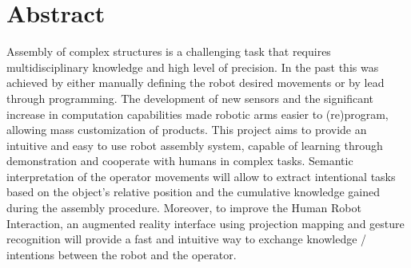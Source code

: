 \chapter*{Abstract}

Assembly of complex structures is a challenging task that requires multidisciplinary knowledge and high level of precision. In the past this was achieved by either manually defining the robot desired movements or by lead through programming. The development of new sensors and the significant increase in computation capabilities made robotic arms easier to (re)program, allowing mass customization of products. This project aims to provide an intuitive and easy to use robot assembly system, capable of learning through demonstration and cooperate with humans in complex tasks. Semantic interpretation of the operator movements will allow to extract intentional tasks based on the object's relative position and the cumulative knowledge gained during the assembly procedure. Moreover, to improve the Human Robot Interaction, an augmented reality interface using projection mapping and gesture recognition will provide a fast and intuitive way to exchange knowledge / intentions between the robot and the operator.
